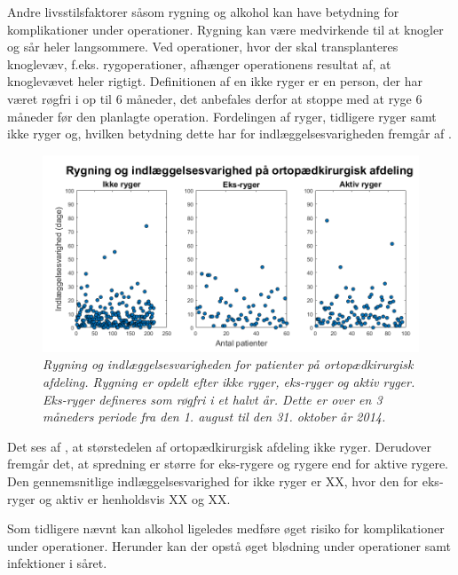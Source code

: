 Andre livsstilsfaktorer såsom rygning og alkohol kan have betydning for komplikationer under operationer. Rygning kan være medvirkende til at knogler og sår heler langsommere. Ved operationer, hvor der skal transplanteres knoglevæv, f.eks. rygoperationer, afhænger operationens resultat af, at knoglevævet heler rigtigt. Definitionen af en ikke ryger er en person, der har været røgfri i op til 6 måneder, det anbefales derfor at stoppe med at ryge 6 måneder før den planlagte operation.\cite{Nordjylland2014} Fordelingen af ryger, tidligere ryger samt ikke ryger og, hvilken betydning dette har for indlæggelsesvarigheden fremgår af .


\begin{figure}[H]
	\centering
	\includegraphics[scale=0.55]{figures/rygerogindlaeg}
	\caption{\textit{Rygning og indlæggelsesvarigheden for patienter på ortopædkirurgisk afdeling. Rygning er opdelt efter ikke ryger, eks-ryger og aktiv ryger. Eks-ryger defineres som røgfri i et halvt år. Dette er over en 3 måneders periode fra den 1. august til den 31. oktober år 2014.}}
	\label{rygningogindlaeggelse}
\end{figure}


\noindent
Det ses af , at størstedelen af ortopædkirurgisk afdeling ikke ryger. Derudover fremgår det, at spredning er større for eks-rygere og rygere end for aktive rygere. Den gennemsnitlige indlæggelsesvarighed for ikke ryger er XX, hvor den for eks-ryger og aktiv er henholdsvis XX og XX.

Som tidligere nævnt kan alkohol ligeledes medføre øget risiko for komplikationer under operationer. Herunder kan der opstå øget blødning under operationer samt infektioner i såret.\cite{Nordjylland2014} 


